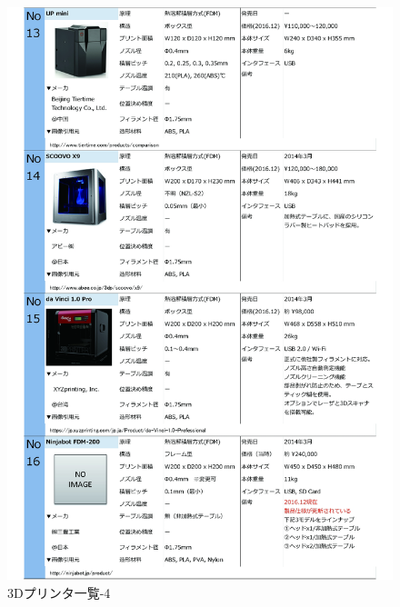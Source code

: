 \begin{figure}[htbp]
\centering
\includegraphics[width=380pt]{fig/fig27_cmyk.jpg}
\caption{3Dプリンタ一覧-4}
\label{fig27}
\end{figure}

